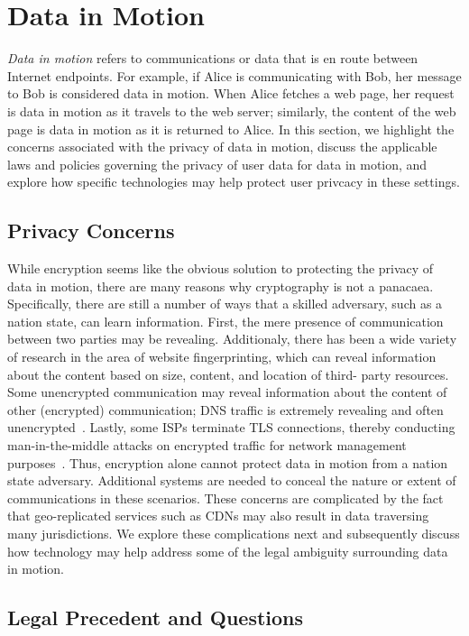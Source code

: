 \section{Data in Motion}
\label{sec:motion}

{\em Data in motion} refers to communications or data that is en route between
Internet endpoints. For example, if Alice is communicating with Bob, her
message to Bob is considered data in motion.  When Alice fetches a web page,
her request is data in motion as it travels to the web server; similarly, the
content of the web page is data in motion as it is returned to Alice. In this
section, we highlight the concerns associated with the privacy of data in
motion, discuss the applicable laws and policies governing the privacy of user
data for data in motion, and explore how specific technologies may help protect
user privcacy in these settings.

\subsection{Privacy Concerns}

While encryption seems like the obvious solution to protecting the privacy of
data in motion, there are many reasons why cryptography is not a panacaea.
Specifically, there are still a number of ways that a skilled adversary, such
as a nation state, can learn information.  First, the mere presence of
communication between two parties may be revealing.  Additionaly, there has
been a wide variety of research in the area of website fingerprinting, which
can reveal information about the content based on size, content, and location
of third- party resources.  Some unencrypted communication may reveal
information about the content of other (encrypted) communication; DNS traffic
is extremely revealing and often unencrypted~\cite{isps_see}.  Lastly, some
ISPs terminate TLS connections, thereby conducting man-in-the-middle attacks
on encrypted traffic for network management purposes~\cite{gogo}. Thus,
encryption alone cannot protect data in motion from a nation state adversary.
Additional systems are needed to conceal the nature or extent of
communications in these scenarios. These concerns are complicated by the fact
that geo-replicated services such as CDNs may also result in data traversing
many jurisdictions.  We explore these complications next and subsequently
discuss how technology may help address some of the legal ambiguity
surrounding data in motion.

\subsection{Legal Precedent and Questions}

